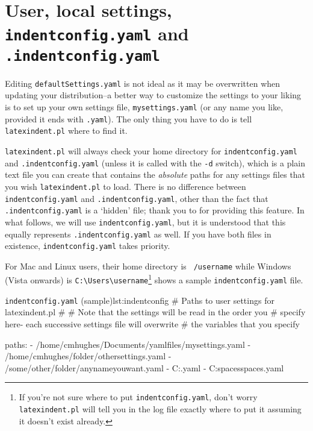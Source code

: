 \section{User, local settings, \texttt{indentconfig.yaml} and \texttt{.indentconfig.yaml}}\label{sec:indentconfig}
 Editing \texttt{defaultSettings.yaml} is not ideal as it may be overwritten when
 updating your distribution--a better way to customize the settings to your liking
 is to set up your own settings file,
 \texttt{mysettings.yaml} (or any name you like, provided it ends with \texttt{.yaml}).
 The only thing you have to do is tell \texttt{latexindent.pl} where to find it.

 \texttt{latexindent.pl} will always check your home directory for \texttt{indentconfig.yaml}
 and  \texttt{.indentconfig.yaml} (unless
 it is called with the \texttt{-d} switch),
 which is a plain text file you can create that contains the \emph{absolute}
 paths for any settings files that you wish \texttt{latexindent.pl} to load. There is no difference
 between \texttt{indentconfig.yaml} and \texttt{.indentconfig.yaml}, other than the
 fact that \texttt{.indentconfig.yaml} is a `hidden' file; thank you to \cite{jacobo-diaz-hidden-config}
 for providing this feature. In what follows, we will use \texttt{indentconfig.yaml}, but it
 is understood that this equally represents \texttt{.indentconfig.yaml} as well. If you
 have both files in existence,  \texttt{indentconfig.yaml} takes priority.

 For Mac and Linux users, their home directory is \texttt{~/username} while
 Windows (Vista onwards) is \lstinline!C:\Users\username!\footnote{If you're not sure
	 where to put \texttt{indentconfig.yaml}, don't
	 worry \texttt{latexindent.pl} will tell you in the log file exactly where to
	 put it assuming it doesn't exist already.}
  shows a sample \texttt{indentconfig.yaml} file.

 \begin{yaml}{\texttt{indentconfig.yaml} (sample)}{lst:indentconfig}
# Paths to user settings for latexindent.pl
#
# Note that the settings will be read in the order you
# specify here- each successive settings file will overwrite
# the variables that you specify

paths:
- /home/cmhughes/Documents/yamlfiles/mysettings.yaml
- /home/cmhughes/folder/othersettings.yaml
- /some/other/folder/anynameyouwant.yaml
- C:\Users\chughes\Documents\mysettings.yaml
- C:\Users\chughes\Desktop\test spaces\more spaces.yaml
\end{yaml}

